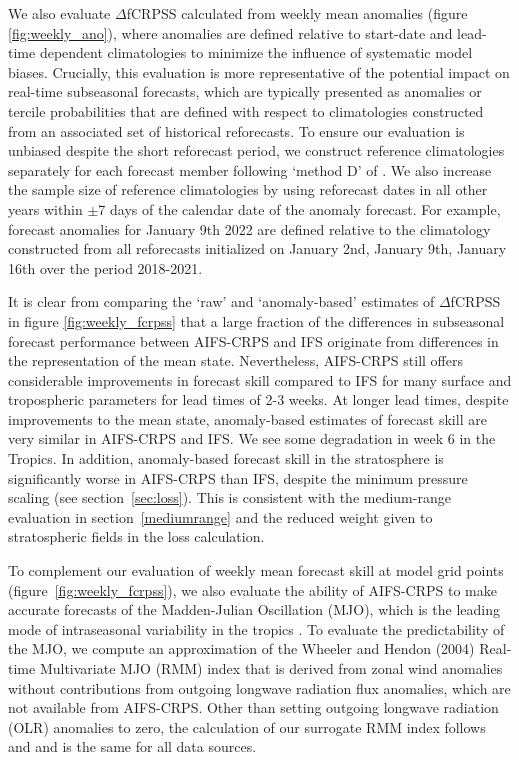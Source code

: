 \documentclass{article}
\begin{document}
We also evaluate $\Delta$fCRPSS calculated from weekly mean anomalies (figure \ref{fig:weekly_ano}), where anomalies are defined relative to start-date and lead-time dependent climatologies to minimize the influence of systematic model biases. Crucially, this evaluation is more representative of the potential impact on real-time subseasonal forecasts, which are typically presented as anomalies or tercile probabilities that are defined with respect to climatologies constructed from an associated set of historical reforecasts. To ensure our evaluation is unbiased despite the short reforecast period, we construct reference climatologies separately for each forecast member following `method D' of \citet{roberts2024unbiased}. We also increase the sample size of reference climatologies by using reforecast dates in all other years within $\pm$7 days of the calendar date of the anomaly forecast. For example, forecast anomalies for January 9th 2022 are defined relative to the climatology constructed from all reforecasts initialized on January 2nd, January 9th, January 16th over the period 2018-2021.

It is clear from comparing the `raw' and `anomaly-based' estimates of $\Delta$fCRPSS in figure \ref{fig:weekly_fcrpss} that a large fraction of the differences in subseasonal forecast performance between AIFS-CRPS and IFS originate from differences in the representation of the mean state. Nevertheless, AIFS-CRPS still offers considerable improvements in forecast skill compared to IFS for many surface and tropospheric parameters for lead times of 2-3 weeks. At longer lead times, despite improvements to the mean state, anomaly-based estimates of forecast skill are very similar in AIFS-CRPS and IFS. We see some degradation in week 6 in the Tropics. In addition, anomaly-based forecast skill in the stratosphere is significantly worse in AIFS-CRPS than IFS, despite the minimum pressure scaling (see section~\ref{sec:loss}). This is consistent with the medium-range evaluation in section~\ref{mediumrange} and the reduced weight given to stratospheric fields in the loss calculation. 

To complement our evaluation of weekly mean forecast skill at model grid points (figure~\ref{fig:weekly_fcrpss}), we also evaluate the ability of AIFS-CRPS to make accurate forecasts of the Madden-Julian Oscillation (MJO), which is the leading mode of intraseasonal variability in the tropics \citep{madden1971detection}. To evaluate the predictability of the MJO, we compute an approximation of the Wheeler and Hendon (2004) Real-time Multivariate MJO (RMM) index that is derived from zonal wind anomalies without contributions from outgoing longwave radiation flux anomalies, which are not available from AIFS-CRPS. Other than setting outgoing longwave radiation (OLR) anomalies to zero, the calculation of our surrogate RMM index follows \citet{wheeler2004all} and \citet{gottschalck2010framework} and is the same for all data sources.
\end{document}
